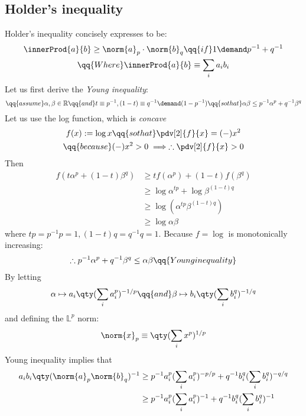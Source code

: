 \subsection*
{Holder's inequality} 
Holder's inequality 
concisely expresses to be: 
\begin{gather*}
    \innerProd
    {a} {b}
\geq 
    \norm{a} _{p}
\cdot 
    \norm{b} _{q}
\qq{if}
    1 \demand 
    p^{-1} + q^{-1}
\\
\qq
{Where}
    \innerProd 
    {a} {b}
\equiv 
    \sum_{i} 
    a_{i} b_{i}
\end{gather*}
Let us first derive 
the {\it Young inequality}: 
$$
\qq
{assume}  
    \alpha, \beta 
    \in \mathbb{R} 
\qq{and}
    t     \equiv p^{-1}, 
    (1-t) \equiv q^{-1} 
          \demand (1 - p^{-1})
\qq{so that}
    \alpha \beta  
\leq 
    p^{-1} \alpha^{p}
+
    q^{-1} \beta^{q}
$$ 
Let us use the log function,
which is {\it concave}
\begin{gather*}
    f(x) := 
    \log x 
\qq{so that}
    \pdv[2]
    {f}{x}
=
    (-) x^{2}
\\
\qq{because}
    (-) x^{2} 
>
    0 
\implies 
\therefore
    \pdv[2]
    {f}{x}
>
    0
\end{gather*}
Then
\begin{align*}
    f 
    (t \alpha ^{p}
     + (1-t) \beta^{q})
&
\geq 
    t f(\alpha ^{p}) 
+
    (1-t) f(\beta^{q}) 
\\
&   
\geq 
    \log \alpha ^{t p}
+
    \log \beta ^{(1-t) q }
\\
&   
\geq 
    \log 
    ( \alpha ^{t p}
    \beta ^{(1-t) q } )
\\
&   
\geq 
    \log \alpha \beta 
\end{align*} 
where 
$ t p   = p^{-1} p = 1,
(1-t) q = q^{-1} q = 1 
$. 
Because $f=\log$ is monotonically increasing:
\begin{align*}
    \therefore 
    p^{-1} \alpha ^{p}
+ 
    q^{-1} \beta^{q}
\leq 
    \alpha \beta  
\qq{Young inequality}
\end{align*}
By letting
\begin{align*} 
    \alpha 
\mapsto
    a_{i} 
    \qty
    (
    \sum_{i}
    a_{i} ^{p}
    )^{-1/p}
\qq{and}
    \beta 
\mapsto
    b_{i} 
    \qty
    (
    \sum_{i}
    b_{i} ^{q}
    )^{-1/q}
\end{align*}
and defining the 
$\mathbb{L}^{p}$ 
norm:
$$
    \norm{x}_{p}
\equiv 
    \qty(
    \sum_{i} 
    x^{p}
    )^{1/p}
$$
Young inequality 
implies that
\begin{align*}
    a_{i} b_{i}
    \qty 
    (\norm{a} _{p}
    \norm{b} _{q}
    )^{-1}
& \geq 
    p^{-1}
    a _{i} ^{p}
    (
    \sum_{i}
    a_{i} ^{p}
    )^{-p/p}
+
    q^{-1}
    b _{i} ^{q}
    (
    \sum_{i}
    b_{i} ^{q}
    )^{-q/q}
\\
& \geq 
    p^{-1}
    a _{i} ^{p}
    (
    \sum_{i}
    a_{i} ^{p}
    )^{-1}
+
    q^{-1}
    b _{i} ^{q}
    (
    \sum_{i}
    b_{i} ^{q}
    )^{-1}
\end{align*}
